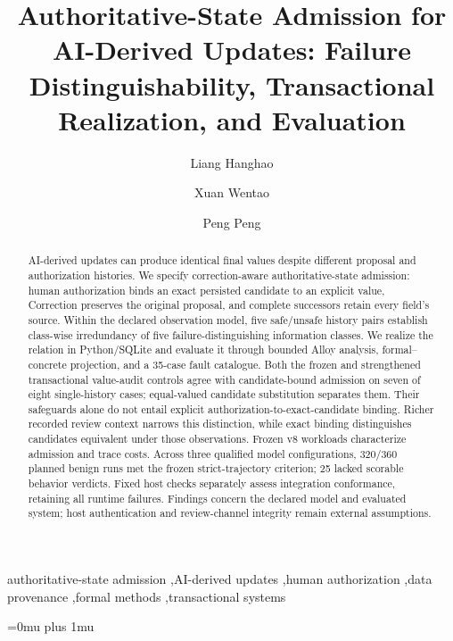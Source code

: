 \documentclass[preprint,12pt,authoryear]{elsarticle}
\begin{document}
\begin{frontmatter}

\title{Authoritative-State Admission for AI-Derived Updates: Failure Distinguishability, Transactional Realization, and Evaluation}

\author[inst1]{Liang Hanghao}
\author[inst1]{Xuan Wentao}
\author[inst1]{Peng Peng}

\begin{abstract}
AI-derived updates can produce identical final values despite different proposal and authorization histories. We specify correction-aware authoritative-state admission: human authorization binds an exact persisted candidate to an explicit value, Correction preserves the original proposal, and complete successors retain every field's source. Within the declared observation model, five safe/unsafe history pairs establish class-wise irredundancy of five failure-distinguishing information classes. We realize the relation in Python/SQLite and evaluate it through bounded Alloy analysis, formal--concrete projection, and a 35-case fault catalogue. Both the frozen and strengthened transactional value-audit controls agree with candidate-bound admission on seven of eight single-history cases; equal-valued candidate substitution separates them. Their safeguards alone do not entail explicit authorization-to-exact-candidate binding. Richer recorded review context narrows this distinction, while exact binding distinguishes candidates equivalent under those observations. Frozen v8 workloads characterize admission and trace costs. Across three qualified model configurations, 320/360 planned benign runs met the frozen strict-trajectory criterion; 25 lacked scorable behavior verdicts. Fixed host checks separately assess integration conformance, retaining all runtime failures. Findings concern the declared model and evaluated system; host authentication and review-channel integrity remain external assumptions.
\end{abstract}

\begin{keyword}
authoritative-state admission \sep AI-derived updates \sep human authorization \sep data provenance \sep formal methods \sep transactional systems
\end{keyword}

\end{frontmatter}














\begingroup
\Urlmuskip=0mu plus 1mu\relax

\endgroup
\end{document}
